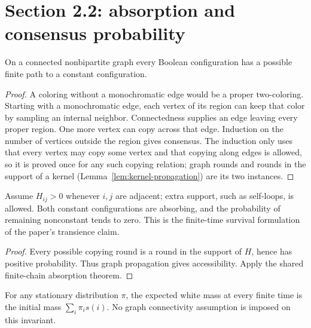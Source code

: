 \section{Section 2.2: absorption and consensus probability}
\begin{lemma}\label{lem:propagation}
\leanok{}
On a connected nonbipartite graph every Boolean configuration has a possible
finite path to a constant configuration.
\end{lemma}
\begin{proof}\leanok
A coloring without a monochromatic edge would be a proper two-coloring.
Starting with a monochromatic edge, each vertex of its region can keep that
color by sampling an internal neighbor. Connectedness supplies an edge leaving
every proper region. One more vertex can copy across that edge. Induction on
the number of vertices outside the region gives consensus. The induction only uses that
every vertex may copy some vertex and that copying along edges is allowed, so it is proved
once for any such copying relation; graph rounds and rounds in the support of a kernel
(Lemma~\ref{lem:kernel-propagation}) are its two instances.
\end{proof}
\begin{lemma}\label{lem:21}
\leanok{}
Assume $H_{ij}>0$ whenever $i,j$ are adjacent; extra support, such as
self-loops, is allowed. Both constant configurations
are absorbing, and the probability of remaining nonconstant tends to zero.
This is the finite-time survival formulation of the paper's transience claim.
\end{lemma}
\begin{proof}\leanok
Every possible copying round is a round in the support of $H$, hence has positive
probability. Thus graph propagation gives accessibility. Apply the shared finite-chain
absorption theorem.
\end{proof}
\begin{lemma}\label{lem:23}
\leanok{}
For any stationary distribution $\pi$, the expected white mass at every finite
time is the initial mass $\sum_i\pi_i s(i)$. No graph connectivity assumption
is imposed on this invariant.
\end{lemma}
